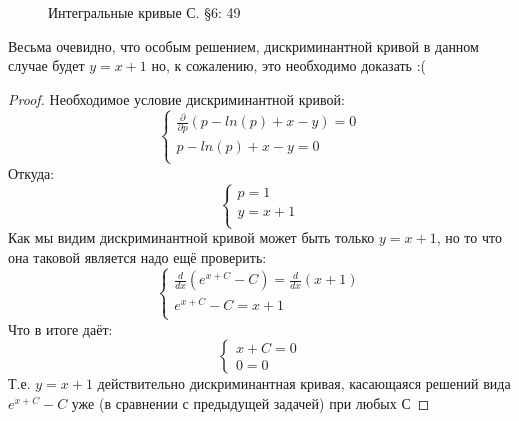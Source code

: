 \documentclass{article}
\begin{document}
\begin{figure}[h]
\caption{Интегральные кривые С. \S6: 49}
\label{fig:6.49}
\end{figure}
\newline
Весьма очевидно, что особым решением, дискриминантной кривой в данном случае будет $y=x+1$ но, к сожалению, это необходимо доказать :(
\begin{proof}
Необходимое условие дискриминантной кривой:
\begin{equation}
    \begin{cases}
    \frac{\partial}{\partial p}(p - ln(p) + x - y) = 0\\
    p - ln(p) + x -y=0\\
    \end{cases}
\end{equation}
Откуда:
\begin{equation}
    \begin{cases}
    p=1\\
    y=x+1\\
    \end{cases}
\end{equation}
Как мы видим дискриминантной кривой может быть только $y=x+1$, но то что она таковой является надо ещё проверить:
\begin{equation}
    \begin{cases}
    \frac{d}{d x}(e^{x+C}-C)=\frac{d}{d x}(x+1)\\
    e^{x+C}-C=x+1\\
    \end{cases}
\end{equation}
Что в итоге даёт:
\begin{equation}
    \begin{cases}
    x+C=0\\
    0=0
    \end{cases}
\end{equation}
Т.е. $y=x+1$ действительно дискриминантная кривая, касающаяся решений  вида $e^{x+C}-C$ уже (в сравнении с предыдущей задачей) при любых $С$
\end{proof}
\end{document}
